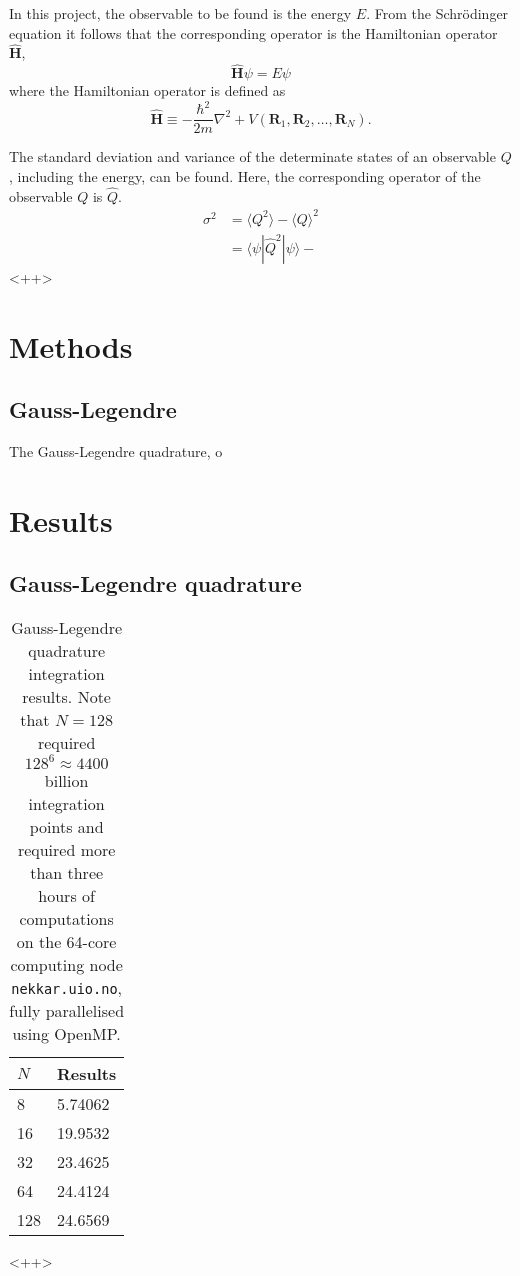 \documentclass[a4paper,11pt]{article}
\begin{document}
In this project, the observable to be found is the energy $E$. From the Schr\"odinger equation it follows that the corresponding operator is the Hamiltonian operator $\hat{\mathbf{H}}$,
\begin{equation}
    \hat{\mathbf{H}} \psi = E \psi
    \label{eq:schrodinger}
\end{equation}
where the Hamiltonian operator is defined as
\begin{equation}
    \hat{\mathbf{H}}    \equiv  -\frac{\hbar^2}{2m} \nabla^2 + V(\mathbf{R}_1, \mathbf{R}_2, \dots, \mathbf{R}_N).
    \label{eq:hamiltonian}
\end{equation}

The standard deviation and variance of the determinate states of an observable $Q$, including the energy, can be found. Here, the corresponding operator of the observable $Q$ is $\hat{Q}$.
\begin{align*}
    \sigma^2 &= \langle Q^2 \rangle - \langle Q \rangle^2 \\
            &=  \langle \psi | \hat{Q}^2 | \psi \rangle - 
\end{align*}<++>

\section{Methods}
\subsection{Gauss-Legendre}
The Gauss-Legendre quadrature, o


\section{Results}
\subsection{Gauss-Legendre quadrature}

\begin{table}
    \centering
    \caption{Gauss-Legendre quadrature integration results. Note that $N=128$ required $128^6 \approx 4400$ billion integration points and required more than three hours of computations on the 64-core computing node \texttt{nekkar.uio.no}, fully parallelised using OpenMP.}
    \begin{tabular}{l l}
        \hline
        $N$ &   Results \\
        \hline
        8   &   5.74062 \\
        16  &   19.9532 \\
        32  &   23.4625 \\
        64  &   24.4124 \\
        128 &   24.6569 \\
        \hline
    \end{tabular}
    \label{tab:<+label+>}
\end{table}<++>
\end{document}
